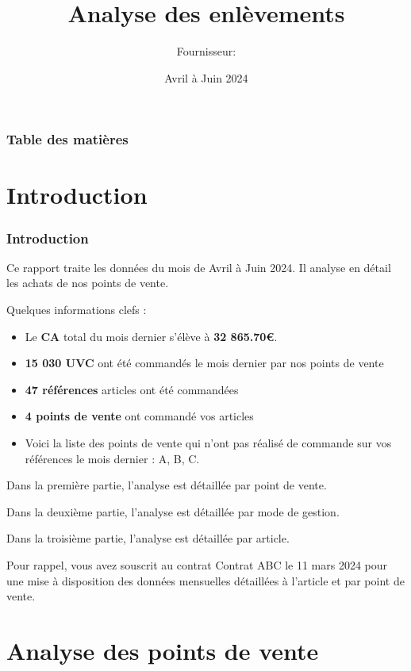 \documentclass{beamer}
\title{Analyse des enlèvements}
\author{Fournisseur: \textbf{}}
\date{Avril à Juin 2024}
\begin{document}
    \begin{frame}
        \titlepage
    \end{frame}

    \begin{frame}
        \frametitle{Table des matières}
        \tableofcontents
    \end{frame}

    \section{Introduction}

    \begin{frame}
        \tiny
        \frametitle{Introduction}
        Ce rapport traite les données du mois de Avril à Juin 2024. Il analyse en détail les achats de nos points de vente.\par

        Quelques informations clefs :

        \begin{itemize}
            \item{Le \textbf{CA} total du mois dernier s’élève à \textbf{32 865.70€}.}
            \item{\textbf{15 030 UVC} ont été commandés le mois dernier par nos points de vente}
            \item{\textbf{47 références} articles ont été commandées}
            \item{\textbf{4 points de vente} ont commandé vos articles}
            \item{Voici la liste des points de vente qui n’ont pas réalisé de commande sur vos références le mois dernier : A, B, C.}
        \end{itemize}

        Dans la première partie, l’analyse est détaillée par point de vente.\par
        Dans la deuxième partie, l’analyse est détaillée par mode de gestion.\par
        Dans la troisième partie, l’analyse est détaillée par article.\par
        Pour rappel, vous avez souscrit au contrat Contrat ABC le 11 mars 2024 pour une mise à disposition des données mensuelles détaillées à l’article et par point de vente.\par
    \end{frame}

    \section{Analyse des points de vente}
\end{document}

